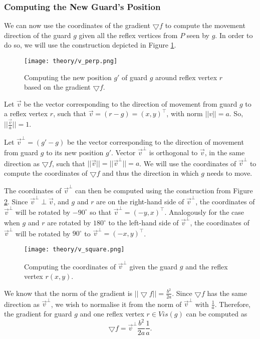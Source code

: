 \subsubsection{Computing the New Guard's Position}
We can now use the coordinates of the gradient $\bigtriangledown f$ to compute the movement direction of the guard $g$ given all the reflex vertices from $P$ seen by $g$. In order to do so, we will use the construction depicted in Figure \ref{fig:vperp}. 

\begin{figure}[h!]
    \centering
    \texttt{[image: theory/v\_perp.png]}
    \caption{Computing the new position $g'$ of guard $g$ around reflex vertex $r$ based on the gradient $\bigtriangledown f$.}
    \label{fig:vperp}
\end{figure}

Let $\vec v$ be the vector corresponding to the direction of movement from guard $g$ to a reflex vertex $r$, such that $\vec{v} = (r - g) = (x, y)^\intercal$, with norm $||v|| = a$. So, $||\frac{\vec v}{a}|| = 1$.

Let $\vec{v}^\perp  = (g' - g)$ be the vector corresponding to the direction of movement from guard $g$ to its new position $g'$. Vector $\vec v^\perp$ is orthogonal to $\vec{v}$, in the same direction as $\bigtriangledown f$, such that $||\vec{v}|| = ||\vec{v}^\perp|| = a$. We will use the coordinates of $\vec{v}^\perp$ to compute the coordinates of $\bigtriangledown f$ and thus the direction in which $g$ needs to move.

The coordinates of $\vec v^\perp$ can then be computed using the construction from Figure \ref{fig:vsquare}. Since $\vec v^\perp \perp \vec v$, and $g$ and $r$ are on the right-hand side of $\vec v^\perp$, the coordinates of $\vec v^\perp$ will be rotated by $-90^\circ$ so that $\vec v^\perp = (-y, x)^\intercal$. Analogously for the case when $g$ and $r$ are rotated by $180^\circ$ to the left-hand side of $\vec v^\perp$, the coordinates of $\vec v^\perp$ will be rotated by $90^\circ$ to $\vec v^\perp = (-x, y)^\intercal$.

\begin{figure}[h!]
    \centering
    \texttt{[image: theory/v\_square.png]}
    \caption{Computing the coordinates of $\vec v^\perp$ given the guard $g$ and the reflex vertex $r(x, y)$.}
    \label{fig:vsquare}
\end{figure}

We know that the norm of the gradient is $||\bigtriangledown f|| = \frac{b^2}{2a}$. Since $\bigtriangledown f$ has the same direction as $\vec v^\perp$, we wish to normalise it from the norm of $\vec v^\perp$ with $\frac 1 a$. Therefore, the gradient for guard $g$ and one reflex vertex $r \in \mathit{Vis}(g)$ can be computed as $$\bigtriangledown f = \vec v^\perp \frac{b^2}{2a} \frac 1 a.$$

